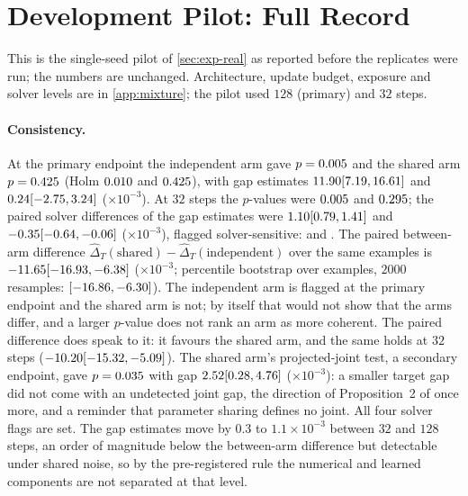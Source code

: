 \documentclass{article}
\theoremstyle{plain}
\theoremstyle{definition}
\theoremstyle{remark}
\begin{document}
\section{Development Pilot: Full Record}
\label{app:pilot}
This is the single-seed pilot of \cref{sec:exp-real} as reported before the replicates were run; the numbers are unchanged. Architecture, update budget, exposure and solver levels are in \cref{app:mixture}; the pilot used $128$ (primary) and $32$ steps.

\begin{table}[h]
\centering
\caption{Neural flow learners on the mixture probe (test split, Test~P, $N=200$, $M=64$, $B=199$). $\widehat\Delta_T$ and $\widehat\Delta_J^U$ are mean unbiased energy distances between the direct and sequential branches; $\widehat D_U(\text{direct},\text{truth})$ is the unbiased sample energy distance between the $64$ direct samples and the true $q(z\mid x)$ (closed-form cross and truth terms), which may be negative and is not the closed-form population distance of \cref{tab:synlearn}. All on the standardized scale; intervals are normal 95\% CIs over examples.}
\label{tab:fm}
\scriptsize
\setlength{\tabcolsep}{3pt}

\end{table}



\paragraph{Consistency.}
At the primary endpoint the independent arm gave $p=0.005$ and the shared arm $p=0.425$ (Holm $0.010$ and $0.425$), with gap estimates $11.90 [7.19, 16.61]$ and $0.24 [-2.75, 3.24]$ ($\times10^{-3}$).
At $32$ steps the $p$-values were $0.005$ and $0.295$; the paired solver differences of the gap estimates were $1.10 [0.79, 1.41]$ and $-0.35 [-0.64, -0.06]$ ($\times10^{-3}$), flagged solver-sensitive: \numFmIndSolverFlag{} and \numFmShSolverFlag.
The paired between-arm difference $\widehat\Delta_T(\text{shared})-\widehat\Delta_T(\text{independent})$ over the same examples is $-11.65 [-16.93, -6.38]$ ($\times10^{-3}$; percentile bootstrap over examples, $2000$ resamples: $[-16.86, -6.30]$).
The independent arm is flagged at the primary endpoint and the shared arm is not; by itself that would not show that the arms differ, and a larger $p$-value does not rank an arm as more coherent. The paired difference does speak to it: it favours the shared arm, and the same holds at $32$ steps ($-10.20 [-15.32, -5.09]$).
The shared arm's projected-joint test, a secondary endpoint, gave $p=0.035$ with gap $2.52 [0.28, 4.76]$ ($\times10^{-3}$): a smaller target gap did not come with an undetected joint gap, the direction of Proposition~2 of \citet{klotergens2026tabular} once more, and a reminder that parameter sharing defines no joint.
All four solver flags are set. The gap estimates move by $0.3$ to $1.1\times10^{-3}$ between $32$ and $128$ steps, an order of magnitude below the between-arm difference but detectable under shared noise, so by the pre-registered rule the numerical and learned components are not separated at that level.
\end{document}
